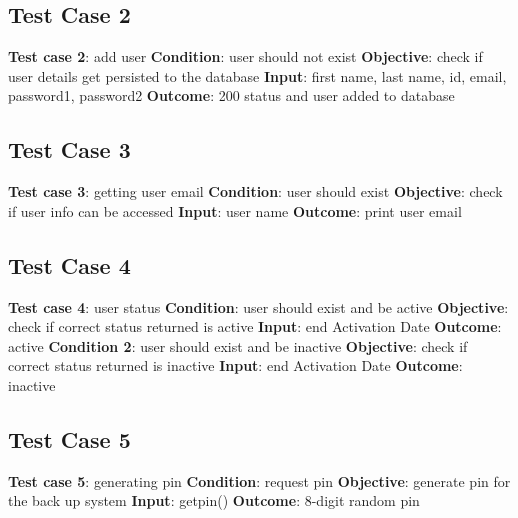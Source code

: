 \documentclass[a4paper,12pt]{article}
\begin{document}
	\subsection{Test Case 2}
		\textbf{Test case 2}: add user \newline
		\textbf{Condition}:  user should not exist \newline
		\textbf{Objective}: check if user details get persisted to the database\newline
		\textbf{Input}: first name, last name, id, email, password1, password2 \newline
		\textbf{Outcome}: 200 status and user added to database \newline
		
		\subsection{Test Case 3}
		\textbf{Test case 3}: getting user email \newline
		\textbf{Condition}:  user should exist \newline
		\textbf{Objective}: check if user info can be accessed \newline  
		\textbf{Input}: user name \newline
		\textbf{Outcome}: print user email \newline
			
		\subsection{Test Case 4}
		\textbf{Test case 4}: user status \newline
		\textbf{Condition}: user should exist and be active \newline
		\textbf{Objective}: check if correct status returned is active \newline
		\textbf{Input}: end Activation Date \newline
		\textbf{Outcome}: active \newline
		\newline
		\textbf{Condition 2}: user should exist and be inactive \newline
		\textbf{Objective}: check if correct status returned is inactive \newline
		\textbf{Input}: end Activation Date \newline
		\textbf{Outcome}: inactive \newline
		
		\subsection{Test Case 5}
		\textbf{Test case 5}: generating pin \newline
		\textbf{Condition}: request pin \newline
		\textbf{Objective}: generate pin for the back up system \newline
		\textbf{Input}: getpin() \newline
		\textbf{Outcome}: 8-digit random pin \newline
		
\end{document}
